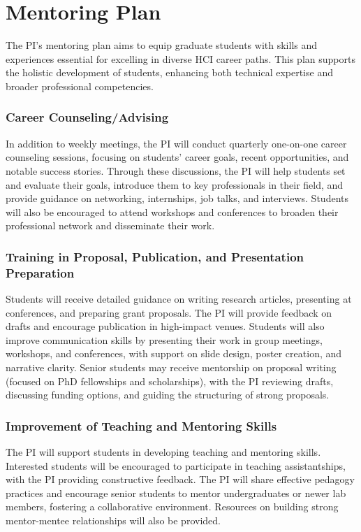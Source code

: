 \section*{Mentoring Plan}

The PI’s mentoring plan aims to equip graduate students with skills and experiences essential for excelling in diverse HCI career paths. This plan supports the holistic development of students, enhancing both technical expertise and broader professional competencies.

\subsubsection*{Career Counseling/Advising} In addition to weekly meetings, the PI will conduct quarterly one-on-one career counseling sessions, focusing on students' career goals, recent opportunities, and notable success stories. Through these discussions, the PI will help students set and evaluate their goals, introduce them to key professionals in their field, and provide guidance on networking, internships, job talks, and interviews. Students will also be encouraged to attend workshops and conferences to broaden their professional network and disseminate their work.

\subsubsection*{Training in Proposal, Publication, and Presentation Preparation} Students will receive detailed guidance on writing research articles, presenting at conferences, and preparing grant proposals. The PI will provide feedback on drafts and encourage publication in high-impact venues. Students will also improve communication skills by presenting their work in group meetings, workshops, and conferences, with support on slide design, poster creation, and narrative clarity. Senior students may receive mentorship on proposal writing (focused on PhD fellowships and scholarships), with the PI reviewing drafts, discussing funding options, and guiding the structuring of strong proposals.

\subsubsection*{Improvement of Teaching and Mentoring Skills} The PI will support students in developing teaching and mentoring skills. Interested students will be encouraged to participate in teaching assistantships, with the PI providing constructive feedback. The PI will share effective pedagogy practices and encourage senior students to mentor undergraduates or newer lab members, fostering a collaborative environment. Resources on building strong mentor-mentee relationships will also be provided.

